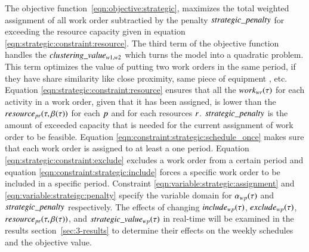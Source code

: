 The objective function~\eqref{eqn:objective:strategic},  maximizes the total
weighted assignment of all work order subtractied by the penalty $strategic\_penalty$
for exceeding the resource capacity given in equation
\eqref{eqn:strategic:constraint:resource}. The third term of the objective
function handles the $clustering\_value_{w1, w2}$ which turns the model into a quadratic
problem. This term optimizes the value of putting two work orders in the same
period, if they have share similarity like close proximity, same piece of equipment
, etc.  Equation \eqref{eqn:strategic:constraint:resource} ensures
that all the $work_{wr}(\tau)$ for each activity in a work
order, given that it has been assigned, is lower than the $resource_{pr}(\tau, \beta_{}(\tau))$ for each
$p$ and for each resources $r$. $strategic\_penalty$ is the
amount of exceeded capacity that is needed for the current assignment of work
order to be feasible. Equation \eqref{eqn:constraint:strategic:schedule_once}
makes sure that each work order is assigned to at least a one
period. Equation \eqref{eqn:strategic:constraint:exclude}
excludes a work order from a certain period and equation
\eqref{eqn:constraint:strategic:include} forces a specific work order to be
included in a specific period. Constraint \eqref{eqn:variable:strategic:assignment}
and \eqref{eqn:variable:strateigc:penalty} specify the variable domain
for $\alpha_{wp}(\tau)$
and $strategic\_penalty$ respectively. The effects of changing $
	include_{wp}(\tau)$, $exclude_{wp}(\tau)$, $resource_{pr}(\tau, \beta_{}(\tau))$, and $
	strategic\_value_{w p}(\tau)$ in real-time will be examined in the results section~\ref{sec:3-results} to
determine their effects on the weekly schedules and the objective value.
